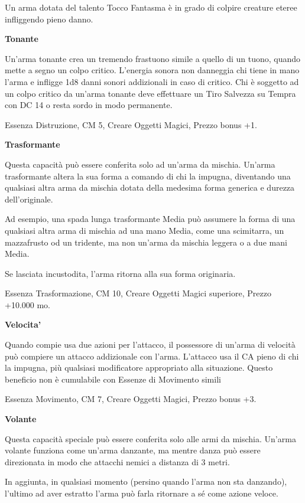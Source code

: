 \documentclass[a4paper,11pt,twoside,openany]{book}
\begin{document}
{Un arma dotata del talento Tocco Fantasma è in grado di colpire creature eteree infliggendo pieno danno.

\textbf{Tonante}

Un'arma tonante crea un tremendo frastuono simile a quello di un tuono, quando mette a segno un colpo critico. L'energia sonora non danneggia chi tiene in mano l'arma e infligge 1d8 danni sonori addizionali in caso di critico. Chi è soggetto ad un colpo critico da un'arma tonante deve effettuare un Tiro Salvezza su Tempra con DC 14 o resta sordo in modo permanente.

Essenza Distruzione, CM 5, Creare Oggetti Magici, Prezzo bonus +1.

\textbf{Trasformante}

Questa capacità può essere conferita solo ad un'arma da mischia. Un'arma trasformante altera la sua forma a comando di chi la impugna, diventando una qualsiasi altra arma da mischia dotata della medesima forma generica e durezza dell'originale. 

Ad esempio, una spada lunga trasformante Media può assumere la forma di una qualsiasi altra arma di mischia ad una mano Media, come una scimitarra, un mazzafrusto od un tridente, ma non un'arma da mischia leggera o a due mani Media. 

Se lasciata incustodita, l'arma ritorna alla sua forma originaria.

Essenza Trasformazione, CM 10, Creare Oggetti Magici superiore, Prezzo +10.000 mo.

\textbf{Velocita'}

Quando compie usa due azioni per l'attacco, il possessore di un'arma di velocità può compiere un attacco addizionale con l'arma. L'attacco usa il CA pieno di chi la impugna, più qualsiasi modificatore appropriato alla situazione. Questo beneficio non è cumulabile con Essenze di Movimento simili

Essenza Movimento, CM 7, Creare Oggetti Magici, Prezzo bonus +3.

\textbf{Volante}

Questa capacità speciale può essere conferita solo alle armi da mischia. Un'arma volante funziona come un'arma danzante, ma mentre danza può essere direzionata in modo che attacchi nemici a distanza di 3 metri. 

In aggiunta, in qualsiasi momento (persino quando l'arma non sta danzando), l'ultimo ad aver estratto l'arma può farla ritornare a sé come azione veloce. 

}
\end{document}
